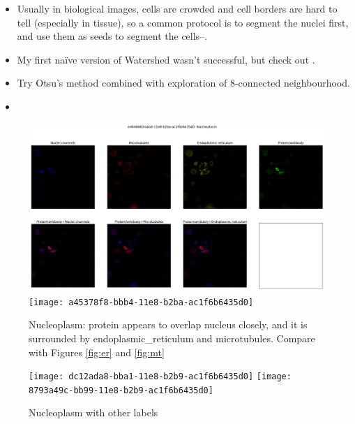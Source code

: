 \documentclass[]{article}
\begin{document}
\begin{itemize}
	\item Usually in biological images, cells are crowded and cell borders are hard to tell (especially in tissue), so a common protocol is to segment the nuclei first, and use them as seeds to segment the cells--\cite{liao2021ground}.
	\item My first na\"ive version of Watershed wasn't successful, but check out \cite{najman1994watershed}.
	\item Try Otsu's method \cite{otsu1979threshold} combined with exploration of 8-connected neighbourhood.
	 \cite{win2018comparative}
	\item \cite{jo2021puzzle}
\end{itemize}

\begin{figure}
	\caption[Nucleoplasm: protein appears to overlap nucleus closely]{Nucleoplasm: protein appears to overlap nucleus closely, and it is surrounded by \gls{endoplasmic_reticulum} and \gls{microtubules}. Compare with Figures \ref{fig:er} and \ref{fig:mt}}\label{fig:nucleoplasm}
	\includegraphics[width=\textwidth]{e4646660-bbb8-11e8-b2ba-ac1f6b6435d0}
	\texttt{[image: a45378f8-bbb4-11e8-b2ba-ac1f6b6435d0]}
\end{figure}

\begin{figure}
	\caption[Nucleoplasm with other labels]{Nucleoplasm with other labels}
	\texttt{[image: dc12ada8-bba1-11e8-b2b9-ac1f6b6435d0]}
	\texttt{[image: 8793a49c-bb99-11e8-b2b9-ac1f6b6435d0]}
\end{figure}
\end{document}
